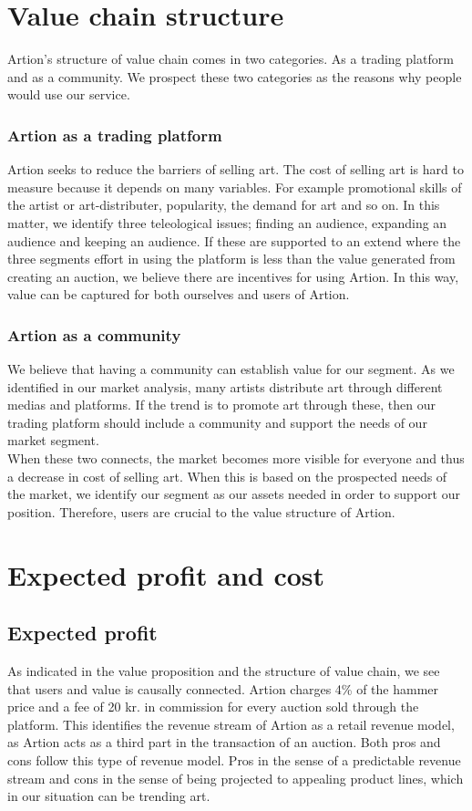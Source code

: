 \section{Value chain structure}
Artion’s structure of value chain comes in two categories. As a trading platform and as a community. We prospect these two categories as the reasons why people would use our service.

\subsubsection{Artion as a trading platform}
Artion seeks to reduce the barriers of selling art. The cost of selling art is hard to measure because it depends on many variables. For example promotional skills of the artist or art-distributer, popularity, the demand for art and so on. In this matter, we identify three teleological issues; finding an audience, expanding an audience and keeping an audience. If these are supported to an extend where the three segments effort in using the platform is less than the value generated from creating an auction, we believe there are incentives for using Artion. In this way, value can be captured for both ourselves and users of Artion. 

\subsubsection{Artion as a community}
\label{Community}
We believe that having a community can establish value for our segment. As we identified in our market analysis, many artists distribute art through different medias and platforms. If the trend is to promote art through these, then our trading platform should include a community and support the needs of our market segment.\\

When these two connects, the market becomes more visible for everyone and thus a decrease in cost of selling art. When this is based on the prospected needs of the market, we identify our segment as our assets needed in order to support our position. Therefore, users are crucial to the value structure of Artion.

\section{Expected profit and cost}

\subsection{Expected profit}
As indicated in the value proposition and the structure of value chain, we see that users and value is causally connected. Artion charges 4\% of the hammer price and a fee of 20 kr. in commission for every auction sold through the platform. This identifies the revenue stream of Artion as a retail revenue model, as Artion acts as a third part in the transaction of an auction. Both pros and cons follow this type of revenue model. Pros in the sense of a predictable revenue stream and cons in the sense of being projected to appealing product lines, which in our situation can be trending art.

